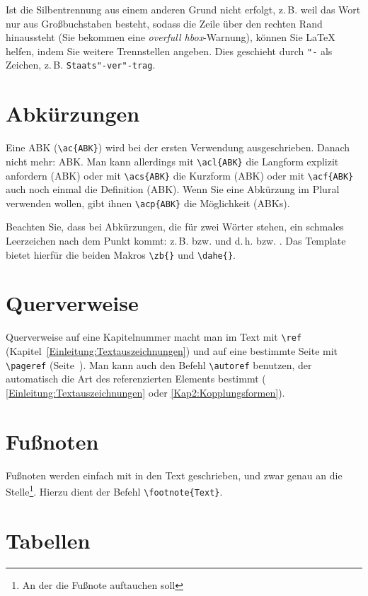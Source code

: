 Ist die Silbentrennung aus einem anderen Grund nicht erfolgt, z.\,B. weil das Wort nur aus Großbuchstaben besteht, sodass die Zeile über den rechten Rand hinaussteht (Sie bekommen eine \textit{overfull hbox}-Warnung), können Sie \LaTeX{} helfen, indem Sie weitere Trennstellen angeben. Dies geschieht durch \verb+"-+ als Zeichen, z.\,B. \verb+Staats"-ver"-trag+.

\section{Abkürzungen}

Eine \ac{ABK} (\verb+\ac{ABK}+) wird bei der ersten Verwendung ausgeschrieben. Danach nicht mehr: \ac{ABK}. Man kann allerdings mit \verb+\acl{ABK}+ die Langform explizit anfordern (\acl{ABK}) oder mit \verb+\acs{ABK}+ die Kurzform (\acs{ABK}) oder mit \verb+\acf{ABK}+ auch noch einmal die Definition (\acf{ABK}). Wenn Sie eine Abkürzung im Plural verwenden wollen, gibt ihnen \verb+\acp{ABK}+ die Möglichkeit (\acp{ABK}).

Beachten Sie, dass bei Abkürzungen, die für zwei Wörter stehen, ein schmales Leerzeichen nach dem Punkt kommt: z.\,B. bzw. \zb{} und d.\,h. bzw. \dahe{}. Das Template bietet hierfür die beiden Makros \verb+\zb{}+ und \verb+\dahe{}+.


\section{Querverweise}

Querverweise auf eine Kapitelnummer macht man im Text mit \verb+\ref+ (Kapitel~\ref{Einleitung:Textauszeichnungen}) und auf eine bestimmte Seite mit \verb+\pageref+ (Seite~\pageref{Einleitung:Textauszeichnungen}). Man kann auch den Befehl \verb+\autoref+ benutzen, der automatisch die Art des referenzierten Elements bestimmt (\zb{} \autoref{Einleitung:Textauszeichnungen} oder \autoref{Kap2:Kopplungsformen}).


\section{Fußnoten}

Fußnoten werden einfach mit in den Text geschrieben, und zwar genau an die Stelle\footnote{An der die Fußnote auftauchen soll}. Hierzu dient der Befehl \verb+\footnote{Text}+.


\section{Tabellen}

